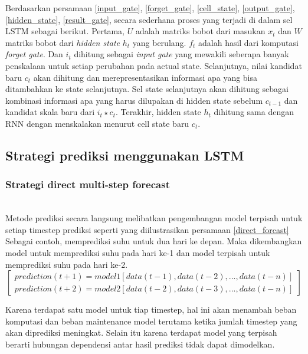 \documentclass[../thesis.tex]{subfiles}
\begin{document}
Berdasarkan persamaan \ref{input_gate}, \ref{forget_gate}, \ref{cell_state}, \ref{output_gate}, \ref{hidden_state}, \ref{result_gate}, secara sederhana proses yang terjadi di dalam sel LSTM sebagai berikut. Pertama, $U$ adalah matriks bobot dari masukan $x_{t}$ dan $W$ matriks bobot dari \textit{hidden state} $h_{t}$ yang berulang. 
$f_{t}$ adalah hasil dari komputasi \textit{forget gate}. Dan $i_{t}$ dihitung sebagai \textit{input gate} yang mewakili seberapa banyak penskalaan untuk setiap perubahan pada actual state. 
Selanjutnya, nilai kandidat baru $c_t$ akan dihitung dan merepresentasikan informasi apa yang bisa ditambahkan ke state selanjutnya. 
Sel state selanjutnya akan dihitung sebagai kombinasi informasi apa yang harus dilupakan di hidden state sebelum $c_{t-1}$ dan kandidat skala baru dari $i_{t} \star c_{t}$. 
Terakhir, hidden state $h_{t}$ dihitung sama dengan RNN dengan menskalakan menurut cell state baru $c_t$.

\subsection{Strategi prediksi menggunakan LSTM}
\subsubsection{Strategi direct multi-step forecast} \hfill\\

Metode prediksi secara langsung melibatkan pengembangan model terpisah untuk setiap timestep prediksi seperti yang diilustrasikan persamaan \ref{direct_forcast}
Sebagai contoh, memprediksi suhu untuk dua hari ke depan. Maka dikembangkan model untuk memprediksi suhu pada hari ke-1 dan model terpisah untuk memprediksi suhu pada hari ke-2.
\begin{equation} \label{direct_forcast}
\begin{bmatrix}
	prediction(t+1) = model1[data(t-1), data(t-2), ..., data(t-n)]
	\\prediction(t+2) = model2[data(t-2), data(t-3), ..., data(t-n)]
\end{bmatrix}
\end{equation}

Karena terdapat satu model untuk tiap timestep, hal ini akan menambah beban komputasi dan beban maintenance model terutama ketika jumlah timestep yang akan diprediksi meningkat. Selain itu
karena terdapat model yang terpisah berarti hubungan dependensi antar hasil prediksi tidak dapat dimodelkan.
\end{document}
